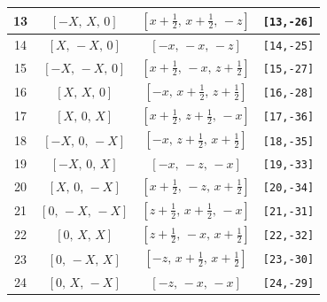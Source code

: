 \documentclass[fleqn,8pt]{jsarticle}
\begin{document}
\begin{longtable}{cccc}
13 & $\left[ - X,\, X,\, 0 \right]$ & $\left[ x + \frac{1}{2},\, x + \frac{1}{2},\, - z \right]$ & {\tt [13,-26]} \\ \hline
14 & $\left[ X,\, - X,\, 0 \right]$ & $\left[ - x,\, - x,\, - z \right]$ & {\tt [14,-25]} \\ \hline
15 & $\left[ - X,\, - X,\, 0 \right]$ & $\left[ x + \frac{1}{2},\, - x,\, z + \frac{1}{2} \right]$ & {\tt [15,-27]} \\ \hline
16 & $\left[ X,\, X,\, 0 \right]$ & $\left[ - x,\, x + \frac{1}{2},\, z + \frac{1}{2} \right]$ & {\tt [16,-28]} \\ \hline
17 & $\left[ X,\, 0,\, X \right]$ & $\left[ x + \frac{1}{2},\, z + \frac{1}{2},\, - x \right]$ & {\tt [17,-36]} \\ \hline
18 & $\left[ - X,\, 0,\, - X \right]$ & $\left[ - x,\, z + \frac{1}{2},\, x + \frac{1}{2} \right]$ & {\tt [18,-35]} \\ \hline
19 & $\left[ - X,\, 0,\, X \right]$ & $\left[ - x,\, - z,\, - x \right]$ & {\tt [19,-33]} \\ \hline
20 & $\left[ X,\, 0,\, - X \right]$ & $\left[ x + \frac{1}{2},\, - z,\, x + \frac{1}{2} \right]$ & {\tt [20,-34]} \\ \hline
21 & $\left[ 0,\, - X,\, - X \right]$ & $\left[ z + \frac{1}{2},\, x + \frac{1}{2},\, - x \right]$ & {\tt [21,-31]} \\ \hline
22 & $\left[ 0,\, X,\, X \right]$ & $\left[ z + \frac{1}{2},\, - x,\, x + \frac{1}{2} \right]$ & {\tt [22,-32]} \\ \hline
23 & $\left[ 0,\, - X,\, X \right]$ & $\left[ - z,\, x + \frac{1}{2},\, x + \frac{1}{2} \right]$ & {\tt [23,-30]} \\ \hline
24 & $\left[ 0,\, X,\, - X \right]$ & $\left[ - z,\, - x,\, - x \right]$ & {\tt [24,-29]} \\
\end{longtable}
\renewcommand{\arraystretch}{1.2}
\end{document}
